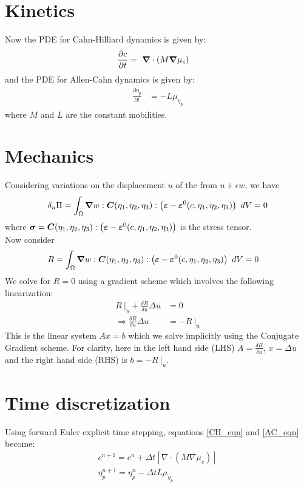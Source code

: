 \documentclass[11pt]{article}
\newcommand{\gv}[1]{\ensuremath{\mbox{\boldmath$ #1 $}}}
\newcommand{\grad}[1]{\gv{\nabla} #1} %
\renewcommand{\=}[1]{\stackrel{#1}{=}} %
\theoremstyle{definition}
\theoremstyle{remark}
\def\Bsigma{\mbox{\boldmath$\sigma$}}
\def\Bvarepsilon{\mbox{\boldmath$\varepsilon$}}
\def\bC{\mbox{\boldmath$ C$}}
\begin{document}
\section{Kinetics}
Now the PDE for Cahn-Hilliard dynamics is given by:
\begin{align}
  \frac{\partial c}{\partial t} &= ~\grad \cdot (M \grad \mu_c) \label{CH_eqn}
  \end{align}
  and the PDE for Allen-Cahn dynamics is given by:
  \begin{align}
    \frac{\partial \eta_p}{\partial t} &= - L \mu_{\eta_p} \label{AC_eqn}
\end{align}
where $M$ and $L$ are the constant mobilities. 

\section{Mechanics}
Considering variations on the displacement $u$ of the from $u+\epsilon w$, we have
\begin{align}
\delta_u \Pi &=  \int_{\Omega}   \grad w :  \bC(\eta_1, \eta_2, \eta_3) : \left( \Bvarepsilon - \Bvarepsilon^0(c,\eta_1, \eta_2, \eta_3)\right) ~dV = 0 \\
\end{align}
where $\Bsigma = \bC(\eta_1, \eta_2, \eta_3) : \left( \Bvarepsilon - \Bvarepsilon^0(c,\eta_1, \eta_2, \eta_3)\right)$ is the stress tensor. \\

Now consider\\
\begin{align}
R &=  \int_{\Omega}   \grad w :  \bC(\eta_1, \eta_2, \eta_3) : \left( \Bvarepsilon - \Bvarepsilon^0(c,\eta_1, \eta_2, \eta_3)\right) ~dV = 0 
\end{align}
We solve for $R=0$ using a gradient scheme which involves the following linearization:
\begin{align}
R~|_{u}+ \frac{\delta R}{\delta u} \Delta u &= 0 \\
\Rightarrow \frac{\delta R}{\delta u} \Delta u &= -R~|_{u}
\end{align}
This is the linear system $Ax=b$ which we solve implicitly using the Conjugate Gradient scheme. For clarity, here in the left hand side (LHS) $A=\frac{\delta R}{\delta u}$, $x=\Delta u$ and the right hand side (RHS) is $b=-R~|_{u}$.


\section{Time discretization}
Using forward Euler explicit time stepping, equations \ref{CH_eqn} and \ref{AC_eqn} become:
\begin{align}
c^{n+1} = c^{n}+\Delta t [\nabla \cdot (M \nabla \mu_c) ]\\
\eta_p^{n+1} = \eta_p^n -\Delta t L \mu_{\eta_p}
\end{align}
\end{document}
